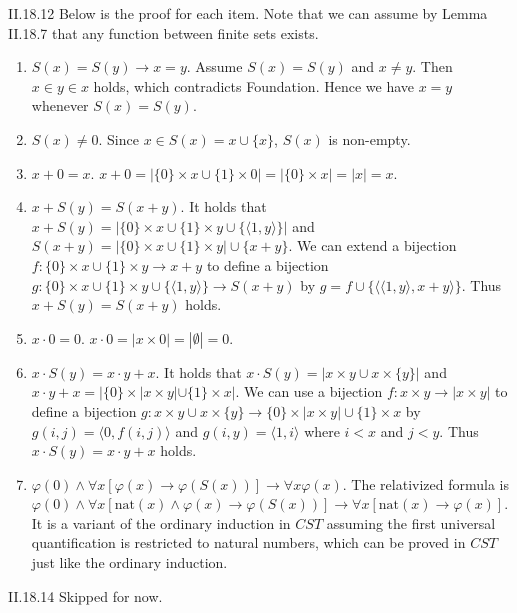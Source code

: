 \documentclass[12pt]{article}
\begin{document}
\begin{customthm}{II.18.12} Below is the proof for each item. Note that we can assume by Lemma II.18.7 that any function between finite sets exists.
  \begin{enumerate}[label=\alph*.]
    \item\underline{$S(x)=S(y)\rightarrow x=y$}. Assume $S(x)=S(y)$ and $x\neq y$. Then $x\in y\in x$ holds, which contradicts Foundation. Hence we have $x=y$ whenever $S(x)=S(y)$.
    \item\underline{$S(x)\neq 0$}. Since $x\in S(x)=x\cup\{x\}$, $S(x)$ is non-empty.
    \item\underline{$x+0=x$}. $x+0=|\{0\}\times x\cup\{1\}\times0|=|\{0\}\times x|=|x|=x$.
    \item\underline{$x+S(y)=S(x+y)$}. It holds that $x+S(y)=|\{0\}\times x\cup\{1\}\times y\cup\{\langle1,y\rangle\}|$ and $S(x+y)=|\{0\}\times x\cup\{1\}\times y|\cup\{x+y\}$. We can extend a bijection $f:\{0\}\times x\cup\{1\}\times y\rightarrow x+y$ to define a bijection $g:\{0\}\times x\cup\{1\}\times y\cup\{\langle1,y\rangle\}\rightarrow S(x+y)$ by $g=f\cup\{\langle\langle1,y\rangle,x+y\rangle\}$. Thus $x+S(y)=S(x+y)$ holds.
    \item\underline{$x\cdot 0=0$}. $x\cdot 0=|x\times 0|=|\emptyset|=0$.
    \item\underline{$x\cdot S(y)=x\cdot y+x$}. It holds that $x\cdot S(y)=|x\times y\cup x\times\{y\}|$ and $x\cdot y+x=|\{0\}\times|x\times y|\cup\{1\}\times x|$. We can use a bijection $f:x\times y\rightarrow|x\times y|$ to define a bijection $g:x\times y\cup x\times\{y\}\rightarrow\{0\}\times|x\times y|\cup\{1\}\times x$ by $g(i,j)=\langle0,f(i,j)\rangle$ and $g(i,y)=\langle1,i\rangle$ where $i<x$ and $j<y$. Thus $x\cdot S(y)=x\cdot y+x$ holds.
    \item\underline{$\varphi(0)\wedge\forall x[\varphi(x)\rightarrow\varphi(S(x))]\rightarrow\forall x\varphi(x)$}. The relativized formula is $\varphi(0)\wedge\forall x[\mathrm{nat}(x)\wedge\varphi(x)\rightarrow\varphi(S(x))]\rightarrow\forall x[\mathrm{nat}(x)\rightarrow\varphi(x)]$. It is a variant of the ordinary induction in $CST$ assuming the first universal quantification is restricted to natural numbers, which can be proved in $CST$ just like the ordinary induction.
  \end{enumerate}
\end{customthm}

\begin{customthm}{II.18.14}
  Skipped for now.
\end{customthm}
\end{document}
